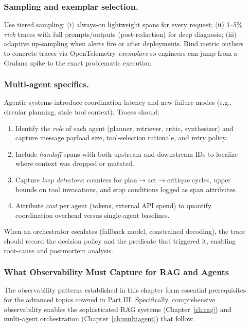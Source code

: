 \subsubsection{Sampling and exemplar selection.}
Use tiered sampling: (i) always-on lightweight spans for every request; (ii) 1–5\% \emph{rich} traces with full prompts/outputs (post-redaction) for deep diagnosis; (iii) adaptive up-sampling when alerts fire or after deployments. Bind metric outliers to concrete traces via OpenTelemetry \emph{exemplars} \cite{otel_spec} so engineers can jump from a Grafana \cite{grafana_dashboards} spike to the exact problematic execution.

\subsubsection{Multi-agent specifics.}
Agentic systems introduce coordination latency and new failure modes (e.g., circular planning, stale tool context). Traces should:
\begin{enumerate}[leftmargin=1.2em]
\item Identify the \emph{role} of each agent (planner, retriever, critic, synthesizer) and capture message payload size, tool-selection rationale, and retry policy.
\item Include \emph{handoff} spans with both upstream and downstream IDs to localize where context was dropped or mutated.
\item Capture \emph{loop detectors}: counters for plan$\to$act$\to$critique cycles, upper bounds on tool invocations, and stop conditions logged as span attributes.
\item Attribute \emph{cost} per agent (tokens, external API spend) to quantify coordination overhead versus single-agent baselines.
\end{enumerate}
When an orchestrator escalates (fallback model, constrained decoding), the trace should record the decision policy and the predicate that triggered it, enabling root-cause and postmortem analysis.

\subsubsection{What Observability Must Capture for RAG and Agents}
\label{subsec:observability-rag-agents-bridge}
The observability patterns established in this chapter form essential prerequisites for the advanced topics covered in Part III. Specifically, comprehensive observability enables the sophisticated RAG systems (Chapter~\ref{ch:rag}) and multi-agent orchestration (Chapter~\ref{ch:multiagent}) that follow.

